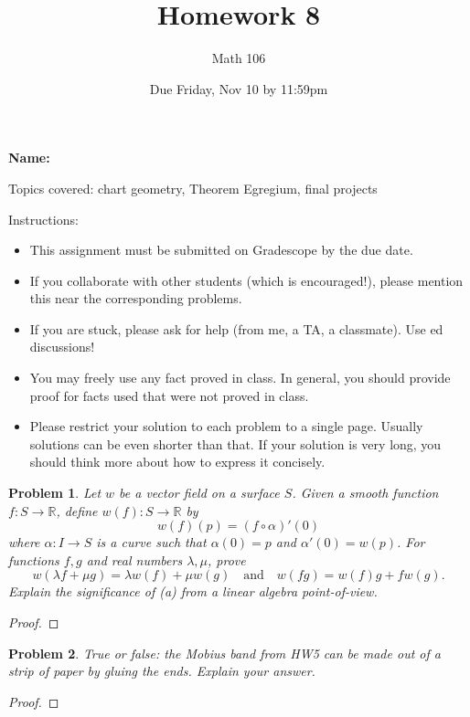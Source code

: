 \documentclass[11pt]{article}
\author{Math 106}
\date{Due Friday, Nov 10 by 11:59pm}
\title{Homework 8}
\newtheorem{problem}{Problem}
\begin{document}
\maketitle

{\bf\Large Name:} 


\vspace{.3in}
Topics covered: chart geometry, Theorem Egregium, final projects

Instructions: 
\begin{itemize}
\item This assignment must be submitted on Gradescope by the due date. 
\item If you collaborate with other students (which is encouraged!), please mention this near the corresponding problems. 
\item If you are stuck, please ask for help (from me, a TA, a classmate). Use ed discussions!  
\item You may freely use any fact proved in class. In general, you should provide proof for facts used that were not proved in class. 
\item Please restrict your solution to each problem to a single page. Usually solutions can be even shorter than that. If your solution is very long, you should think more about how to express it concisely.
\end{itemize}
\pagebreak 

\begin{problem}
Let $w$ be a vector field on a surface $S$. Given a smooth function $f:S\to\mathbb R$, define $w(f):S\to\mathbb R$ by 
\[w(f)(p)=(f\circ\alpha)'(0)\]
where $\alpha:I\to S$ is a curve such that $\alpha(0)=p$ and $\alpha'(0)=w(p)$. For functions $f,g$ and real numbers $\lambda,\mu$, prove 
\[w(\lambda f+\mu g)=\lambda w(f)+\mu w(g)\>\>\>\text{ and }\>\>\>w(fg)=w(f)g+fw(g).\]
Explain the significance of (a) from a linear algebra point-of-view.
\end{problem}

\begin{proof}

\end{proof}

\pagebreak

\begin{problem}
True or false: the Mobius band from HW5 can be made out of a strip of paper by gluing the ends. Explain your answer. 
\end{problem}

\begin{proof}

\end{proof}
\end{document}
